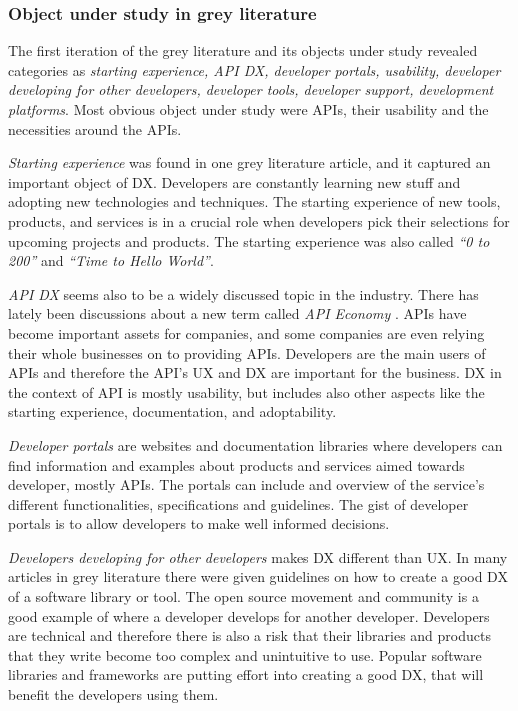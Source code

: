 \documentclass[english, 12pt, a4paper, sci, utf8, a-1b, online]{aaltothesis}
\begin{document}

\subsubsection{Object under study in grey literature}

The first iteration of the grey literature and its objects under study revealed categories as \textit{starting experience, API DX, developer portals, usability, developer developing for other developers, developer tools, developer support, development platforms}. Most obvious object under study were APIs, their usability and the necessities around the APIs.

\textit{Starting experience} was found in one grey literature article, and it captured an important object of DX. Developers are constantly learning new stuff and adopting new technologies and techniques. The starting experience of new tools, products, and services is in a crucial role when developers pick their selections for upcoming projects and products. The starting experience was also called \textit{``0 to 200''} and \textit{``Time to Hello World''}.

\textit{API DX} seems also to be a widely discussed topic in the industry. There has lately been discussions about a new term called \textit{API Economy} \textcite{web-api-economy}. APIs have become important assets for companies, and some companies are even relying their whole businesses on to providing APIs. Developers are the main users of APIs and therefore the API's UX and DX are important for the business. DX in the context of API is mostly usability, but includes also other aspects like the starting experience, documentation, and adoptability.

\textit{Developer portals} are websites and documentation libraries where developers can find information and examples about products and services aimed towards developer, mostly APIs. The portals can include and overview of the service's different functionalities, specifications and guidelines. The gist of developer portals is to allow developers to make well informed decisions.

\textit{Developers developing for other developers} makes DX different than UX. In many articles in grey literature there were given guidelines on how to create a good DX of a software library or tool. The open source movement and community is a good example of where a developer develops for another developer. Developers are technical and therefore there is also a risk that their libraries and products that they write become too complex and unintuitive to use. Popular software libraries and frameworks are putting effort into creating a good DX, that will benefit the developers using them.
\end{document}

